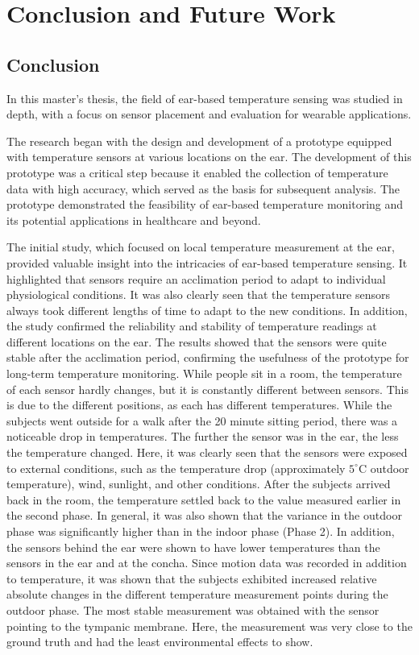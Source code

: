 \chapter{Conclusion and Future Work}
\label{ch:Conclusion}

\section{Conclusion}
In this master's thesis, the field of ear-based temperature sensing was studied in depth, with a focus on sensor placement and evaluation for wearable applications. 

The research began with the design and development of a prototype equipped with temperature sensors at various locations on the ear. 
The development of this prototype was a critical step because it enabled the collection of temperature data with high accuracy, which served as the basis for subsequent analysis. 
The prototype demonstrated the feasibility of ear-based temperature monitoring and its potential applications in healthcare and beyond.

The initial study, which focused on local temperature measurement at the ear, provided valuable insight into the intricacies of ear-based temperature sensing. 
It highlighted that sensors require an acclimation period to adapt to individual physiological conditions. 
It was also clearly seen that the temperature sensors always took different lengths of time to adapt to the new conditions.
In addition, the study confirmed the reliability and stability of temperature readings at different locations on the ear. 
The results showed that the sensors were quite stable after the acclimation period, confirming the usefulness of the prototype for long-term temperature monitoring.
While people sit in a room, the temperature of each sensor hardly changes, but it is constantly different between sensors.
This is due to the different positions, as each has different temperatures.
While the subjects went outside for a walk after the 20 minute sitting period, there was a noticeable drop in temperatures. 
The further the sensor was in the ear, the less the temperature changed.
Here, it was clearly seen that the sensors were exposed to external conditions, such as the temperature drop (approximately $5^\circ\text{C}$ outdoor temperature), wind, sunlight, and other conditions.
After the subjects arrived back in the room, the temperature settled back to the value measured earlier in the second phase.
In general, it was also shown that the variance in the outdoor phase was significantly higher than in the indoor phase (Phase 2).
In addition, the sensors behind the ear were shown to have lower temperatures than the sensors in the ear and at the concha.
Since motion data was recorded in addition to temperature, it was shown that the subjects exhibited increased relative absolute changes in the different temperature measurement points during the outdoor phase.
The most stable measurement was obtained with the sensor pointing to the tympanic membrane. 
Here, the measurement was very close to the ground truth and had the least environmental effects to show.

